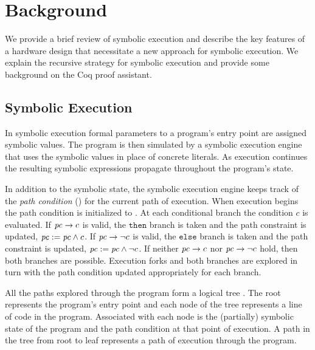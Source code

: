 \section{Background}
We provide a brief review of symbolic execution and describe the key features
of a hardware design that necessitate a new approach for symbolic execution. We
explain the recursive strategy for symbolic execution and provide some
background on the Coq proof assistant.

\subsection{Symbolic Execution}
In symbolic execution formal parameters to a program's entry point are
assigned symbolic values. The program is then simulated by a symbolic execution
engine that uses the symbolic values in place of concrete literals. As
execution continues the resulting symbolic expressions propagate throughout the program's
state.

In addition to the symbolic state, the symbolic execution engine keeps track
of the \emph{path condition} (\pathcondition) for the current path of execution. When execution begins the path condition is initialized
to \texttrue. At each conditional branch the condition $c$ is evaluated. If $\mathit{pc}
\rightarrow c$ is valid, the $\mathtt{then}$ branch is taken and the path constraint is
updated, $\mathit{pc} := \mathit{pc} \wedge c$. If $\mathit{pc} \rightarrow \neg c$ is valid, the $\mathtt{else}$
branch is taken and the path constraint is updated, $\mathit{pc} := \mathit{pc} \wedge \neg
c$. If neither $\mathit{pc} \rightarrow c$ nor $\mathit{pc} \rightarrow \neg c$ hold, then both
branches are possible. Execution forks and both branches are explored in turn
with the path condition updated appropriately for each branch.

All the paths explored through the program form a logical tree \tree. The root represents the
program's entry point and each node of the
tree represents a line of code in the program. Associated with each node is the
(partially) symbolic state of the program and the path condition at that point
of execution. A path in the tree from root to leaf
represents a path of execution through the program.


